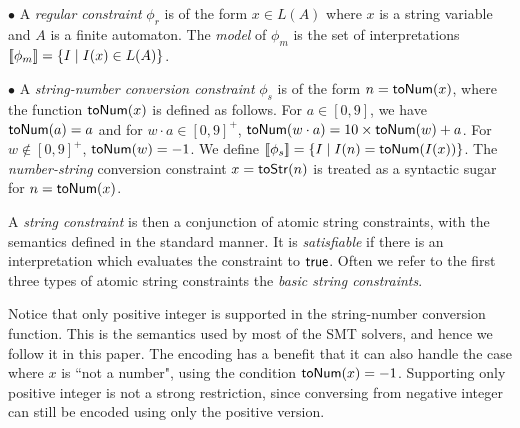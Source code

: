 \documentclass[sigplan,review,anonymous]{acmart}\settopmatter{printfolios=true,printccs=false,printacmref=false}
\begin{document}
$\bullet$ A \emph{regular constraint} $\phi_r$ is of the form $x \in L(A)$ where $x$ is a string variable and $A$ is a finite automaton. The \emph{model} of $\phi_m$ is the set of interpretations $[\![\phi_m]\!]=\{I\mid 
I(x) \in L(A) \}$. 
\smallskip

$\bullet$ A \emph{string-number conversion constraint} $\phi_s$ is of the form $n=\mbox{\textsf{toNum}($x$)}$, where the function $\mbox{\textsf{toNum}($x$)}$ is defined as follows. For $a\in [0,9]$, we have $\mbox{\textsf{toNum}($a$)}=a$ and for $w \cdot a \in [0,9]^+$, $\mbox{\textsf{toNum}($w\cdot a$)} = 10\times \mbox{\textsf{toNum}($w$)}+a$. For $w\notin [0,9]^+$, $\mbox{\textsf{toNum}($w$)}=-1$. We define $[\![\phi_s]\!]= \{I \mid I(n)= \mbox{\textsf{toNum}($I(x)$)} \}$. The \emph{number-string} conversion constraint $x=\mbox{\textsf{toStr}($n$)}$ is treated as a syntactic sugar for $n=\mbox{\textsf{toNum}($x$)}$.
\smallskip

A \emph{string constraint} is then a conjunction of atomic string constraints, with the semantics defined in the standard manner. It is \emph{satisfiable} if there is an interpretation which evaluates the  constraint to $\mbox{$\mathsf{true}$}$. Often we refer to the first three types of atomic string constraints the \emph{basic string constraints}.

Notice that only positive integer is supported in the string-number conversion function. This is the semantics used by most of the SMT solvers, and hence we follow it in this paper. The encoding has a benefit that it can also handle the case where $x$ is ``not a number", using the condition $\mbox{\textsf{toNum}($x$)} = -1$.
Supporting only positive integer is not a strong restriction, since conversing from negative integer can still be encoded using only the positive  version. 


\end{document}
